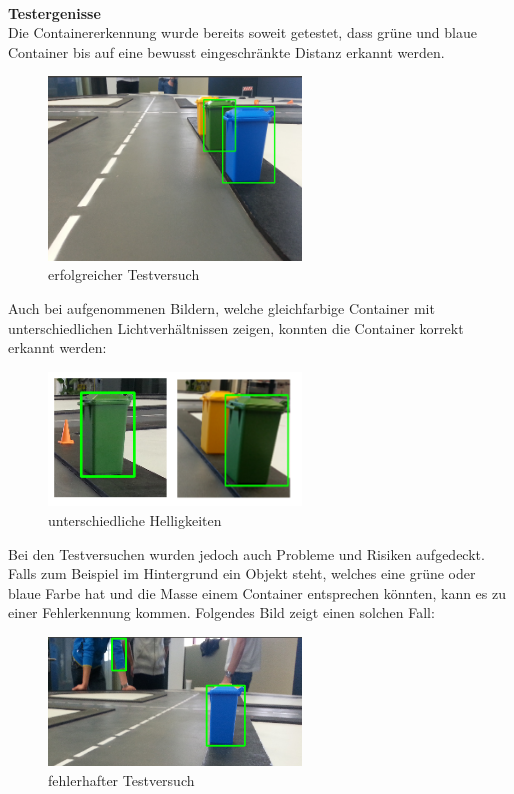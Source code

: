 \\[0.2cm]
\textbf{Testergenisse} \\
Die Containererkennung wurde bereits soweit getestet, dass grüne und blaue Container bis auf eine bewusst eingeschränkte Distanz erkannt werden. 
\begin{figure}[H]%
\centering
\includegraphics[width=0.6\textwidth]{03_Loesungskonzept/pictures/containererkennung_blau_gruen.png}
\caption{erfolgreicher Testversuch}
\label{fig:erfolgreicher Testversuch}
\end{figure}
Auch bei aufgenommenen Bildern, welche gleichfarbige Container mit unterschiedlichen Lichtverhältnissen zeigen, konnten die Container korrekt erkannt werden:
\begin{figure}[H]%
\centering
\includegraphics[width=0.6\textwidth]{03_Loesungskonzept/pictures/containererkennung_div_brightness.png}
\caption{unterschiedliche Helligkeiten}
\label{fig:unterschiedliche Helligkeiten}
\end{figure}
Bei den Testversuchen wurden jedoch auch Probleme und Risiken aufgedeckt. Falls zum Beispiel im Hintergrund ein Objekt steht, welches eine grüne oder blaue Farbe hat und die Masse einem Container entsprechen könnten, kann es zu einer Fehlerkennung kommen. Folgendes Bild zeigt einen solchen Fall:
\begin{figure}[H]%
\centering
\includegraphics[width=0.6\textwidth]{03_Loesungskonzept/pictures/objekterkennung_blau_fehl.png}
\caption{fehlerhafter Testversuch}
\label{fig:fehlerhafter Testversuch}
\end{figure} \\
